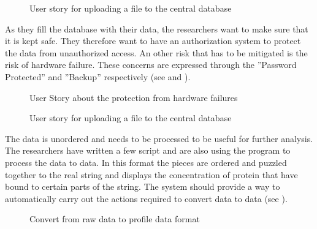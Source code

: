 \begin{figure}[h]
\caption{User story for uploading a file to the central database}
\label{fig:target_annotation}
\end{figure}

As they fill the database with their data, the researchers want to make sure that it is kept safe. They therefore want to have an authorization system to protect the data from unauthorized access. An other risk that has to be mitigated is the risk of hardware failure. These concerns are expressed through the  ''Password Protected'' and ''Backup'' respectively (see  and ).

\begin{figure}[h]
\caption{User Story about the protection from hardware failures}
\label{fig:target_backup}
\end{figure}

\begin{figure}[h]
\caption{User story for uploading a file to the central database}
\label{fig:target_password}
\end{figure}

The  data is unordered and needs to be processed to be useful for further analysis. The researchers have written a few script and are also using the program  to process the  data to  data. In this format the  pieces are ordered and puzzled together to the real  string and displays the concentration of protein that have bound to certain parts of the string. The system should provide a way to automatically carry out the actions required to convert  data to  data (see ). 

\begin{figure}[h]
\caption{Convert from raw data to profile data format}
\label{fig:target_r2p}
\end{figure}

